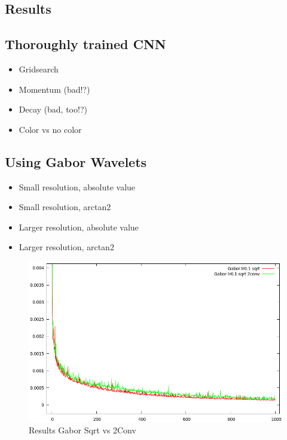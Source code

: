 \documentclass[11pt, a4paper]{article}
\begin{document}
\begin{itemize}
\newpage


\section{Results}

\subsection{Thoroughly trained CNN}

\begin{itemize}
\item Gridsearch
\item Momentum (bad!?)
\item Decay (bad, too!?)
\item Color vs no color
\end{itemize}

\subsection{Using Gabor Wavelets}

\begin{itemize}
\item Small resolution, absolute value
\item Small resolution, arctan2
\item Larger resolution, absolute value
\item Larger resolution, arctan2
\end{itemize}

\begin{figure}[htbp]
	\centering
	\includegraphics[width=\textwidth]{res_gabor_sqrt_vs_2conv.png}
	\caption{Results Gabor Sqrt vs 2Conv}
	\label{fig:res_gabor_sqrt_vs_2conv}
\end{figure}


\end{itemize}
\end{document}
